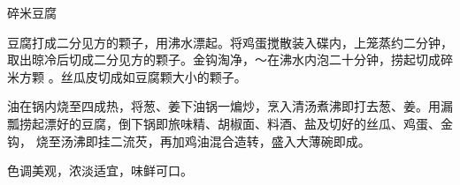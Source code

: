 \begin{recipe}{碎米豆腐}

\ingredients


\preparation

\step 豆腐打成二分见方的颗子，用沸水漂起。将鸡蛋搅散装入碟内，上笼蒸约二分钟，
取出晾冷后切成二分见方的颗子。金钩淘净，〜在沸水内泡二十分钟，捞起切成碎米方颗
。丝瓜皮切成如豆腐颗大小的颗子。

\step 油在锅内烧至四成热，将葱、姜下油锅一煸炒，烹入清汤煮沸即打去葱、姜。用漏
瓢捞起漂好的豆腐，倒下锅即旅味精、胡椒面、料酒、盐及切好的丝瓜、鸡蛋、金钩，
烧至汤沸即挂二流芡，再加鸡油混合造转，盛入大薄碗即成。

\features

色调美观，浓淡适宜，味鲜可口。

\end{recipe}

